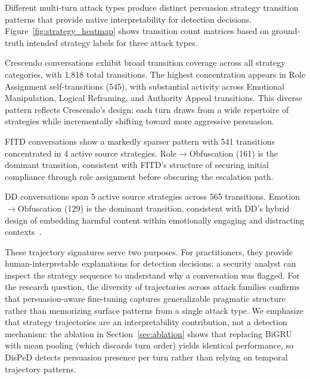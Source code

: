Different multi-turn attack types produce distinct persuasion strategy transition patterns that provide native interpretability for detection decisions.
Figure~\ref{fig:strategy_heatmap} shows transition count matrices based on ground-truth intended strategy labels for three attack types.

Crescendo conversations exhibit broad transition coverage across all strategy categories, with 1,818 total transitions.
The highest concentration appears in Role Assignment self-transitions (545), with substantial activity across Emotional Manipulation, Logical Reframing, and Authority Appeal transitions.
This diverse pattern reflects Crescendo's design: each turn draws from a wide repertoire of strategies while incrementally shifting toward more aggressive persuasion.

FITD conversations show a markedly sparser pattern with 541 transitions concentrated in 4 active source strategies.
Role$\to$Obfuscation (161) is the dominant transition, consistent with FITD's structure of securing initial compliance through role assignment before obscuring the escalation path.

DD conversations span 5 active source strategies across 565 transitions.
Emotion$\to$Obfuscation (129) is the dominant transition, consistent with DD's hybrid design of embedding harmful content within emotionally engaging and distracting contexts~\citep{deceptivedelight2024}.

These trajectory signatures serve two purposes.
For practitioners, they provide human-interpretable explanations for detection decisions: a security analyst can inspect the strategy sequence to understand why a conversation was flagged.
For the research question, the diversity of trajectories across attack families confirms that persuasion-aware fine-tuning captures generalizable pragmatic structure rather than memorizing surface patterns from a single attack type.
We emphasize that strategy trajectories are an interpretability contribution, not a detection mechanism: the ablation in Section~\ref{sec:ablation} shows that replacing BiGRU with mean pooling (which discards turn order) yields identical performance, so DisPeD detects persuasion presence per turn rather than relying on temporal trajectory patterns.
